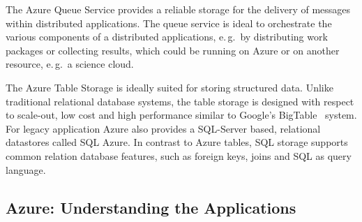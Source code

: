 \documentclass[3p,twocolumn]{elsarticle}
\begin{document}
The Azure Queue Service provides a reliable storage for the delivery
of messages within distributed applications.  The queue service is
ideal to orchestrate the various components of a distributed
applications, e.\,g.\ by distributing work packages or collecting
results, which could be running on Azure or on another resource,
e.\,g.\ a science cloud.

The Azure Table Storage is ideally suited for storing structured
data. Unlike traditional relational database systems, the table
storage is designed with respect to scale-out, low cost and high
performance similar to Google's BigTable~\cite{bigtable2006}
system. For legacy application Azure also provides a SQL-Server based,
relational datastores called SQL Azure. In contrast to Azure tables,
SQL storage supports common relation database features, such as
foreign keys, joins and SQL as query language.


\subsection{Azure: Understanding the Applications}
\end{document}
